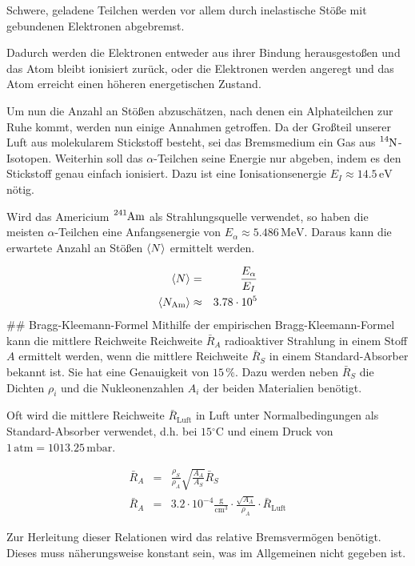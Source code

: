\documentclass[12pt,a4paper]{scrartcl}
\numberwithin{equation}{section} %
\renewcommand{\[}{} %
\renewcommand{\]}{\noindent} %
\begin{document}
Schwere, geladene Teilchen werden vor allem durch inelastische Stöße mit
gebundenen Elektronen abgebremst.

Dadurch werden die Elektronen entweder aus ihrer Bindung herausgestoßen
und das Atom bleibt ionisiert zurück, oder die Elektronen werden
angeregt und das Atom erreicht einen höheren energetischen Zustand.

Um nun die Anzahl an Stößen abzuschätzen, nach denen ein Alphateilchen
zur Ruhe kommt, werden nun einige Annahmen getroffen. Da der Großteil
unserer Luft aus molekularem Stickstoff besteht, sei das Bremsmedium ein
Gas aus $\ce{^{14}N}$-Isotopen. Weiterhin soll das $\alpha$-Teilchen
seine Energie nur abgeben, indem es den Stickstoff genau einfach
ionisiert. Dazu ist eine Ionisationsenergie
$E_I\approx 14.5 \mathrm{\,eV}$ nötig.

Wird das Americium $\ce{^{241}Am}$ als Strahlungsquelle verwendet, so
haben die meisten $\alpha$-Teilchen eine Anfangsenergie von
$E_\alpha\approx 5.486 \mathrm{\,MeV}$. Daraus kann die erwartete
Anzahl an Stößen $\expval{N}$ ermittelt werden.

\[
\begin{eqnarray}
        \expval{N} &=& \frac{E_\alpha}{E_I} \\
    \expval{N_\mathrm{Am}} &\approx& 3.78 \cdot 10^5
\end{eqnarray}
\] \#\# Bragg-Kleemann-Formel Mithilfe der empirischen
Bragg-Kleemann-Formel kann die mittlere Reichweite Reichweite
$\bar R_A$ radioaktiver Strahlung in einem Stoff $A$ ermittelt
werden, wenn die mittlere Reichweite $\bar R_S$ in einem
Standard-Absorber bekannt ist. Sie hat eine Genauigkeit von $15\,\%$.
Dazu werden neben $\bar R_S$ die Dichten $\rho_i$ und die
Nukleonenzahlen $A_i$ der beiden Materialien benötigt.

Oft wird die mittlere Reichweite $\bar R_\mathrm{Luft}$ in Luft unter
Normalbedingungen als Standard-Absorber verwendet, d.h. bei
$15\mathrm{^\circ C}$ und einem Druck von
$1\mathrm{\,atm}=1013.25\mathrm{\,mbar}$.

\[
\begin{eqnarray}
        \bar R_A &=& \frac{\rho_S}{\rho_A}
                \sqrt{\frac{A_A}{A_S}} \bar R_S \\
        \bar R_A &=& 3.2\cdot 10^{-4} \mathrm{\frac{g}{cm^3}}
                \cdot\frac{\sqrt{A_A}}{\rho_A}\cdot \bar R_\mathrm{Luft}
\end{eqnarray}
\]

Zur Herleitung dieser Relationen wird das relative Bremsvermögen
benötigt. Dieses muss näherungsweise konstant sein, was im Allgemeinen
nicht gegeben ist.
\end{document}
